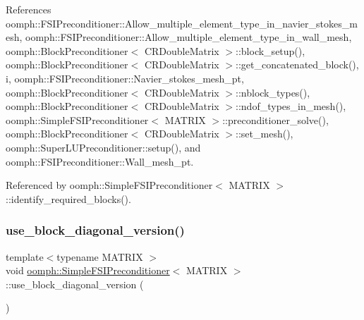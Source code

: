 References oomph\+::\+F\+S\+I\+Preconditioner\+::\+Allow\+\_\+multiple\+\_\+element\+\_\+type\+\_\+in\+\_\+navier\+\_\+stokes\+\_\+mesh, oomph\+::\+F\+S\+I\+Preconditioner\+::\+Allow\+\_\+multiple\+\_\+element\+\_\+type\+\_\+in\+\_\+wall\+\_\+mesh, oomph\+::\+Block\+Preconditioner$<$ C\+R\+Double\+Matrix $>$\+::block\+\_\+setup(), oomph\+::\+Block\+Preconditioner$<$ C\+R\+Double\+Matrix $>$\+::get\+\_\+concatenated\+\_\+block(), i, oomph\+::\+F\+S\+I\+Preconditioner\+::\+Navier\+\_\+stokes\+\_\+mesh\+\_\+pt, oomph\+::\+Block\+Preconditioner$<$ C\+R\+Double\+Matrix $>$\+::nblock\+\_\+types(), oomph\+::\+Block\+Preconditioner$<$ C\+R\+Double\+Matrix $>$\+::ndof\+\_\+types\+\_\+in\+\_\+mesh(), oomph\+::\+Simple\+F\+S\+I\+Preconditioner$<$ M\+A\+T\+R\+I\+X $>$\+::preconditioner\+\_\+solve(), oomph\+::\+Block\+Preconditioner$<$ C\+R\+Double\+Matrix $>$\+::set\+\_\+mesh(), oomph\+::\+Super\+L\+U\+Preconditioner\+::setup(), and oomph\+::\+F\+S\+I\+Preconditioner\+::\+Wall\+\_\+mesh\+\_\+pt.



Referenced by oomph\+::\+Simple\+F\+S\+I\+Preconditioner$<$ M\+A\+T\+R\+I\+X $>$\+::identify\+\_\+required\+\_\+blocks().

\mbox{\label{classoomph_1_1SimpleFSIPreconditioner_a9e4313b890f586d4e1fb406a1b9d3948}} 
\subsubsection{\texorpdfstring{use\+\_\+block\+\_\+diagonal\+\_\+version()}{use\_block\_diagonal\_version()}}
{\footnotesize\ttfamily template$<$typename M\+A\+T\+R\+IX $>$ \\
void \hyperlink{classoomph_1_1SimpleFSIPreconditioner}{oomph\+::\+Simple\+F\+S\+I\+Preconditioner}$<$ M\+A\+T\+R\+IX $>$\+::use\+\_\+block\+\_\+diagonal\+\_\+version (\begin{DoxyParamCaption}{ }\end{DoxyParamCaption})\hspace{0.3cm}{\ttfamily [inline]}}



